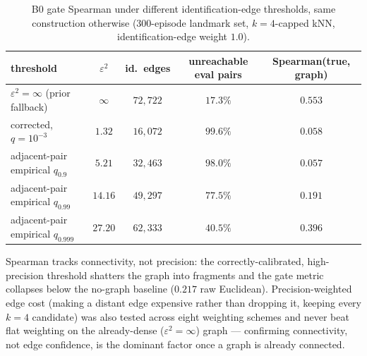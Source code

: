 \documentclass[11pt]{article}
\begin{document}
\begin{table}[h]
\centering
\small
\caption{B0 gate Spearman under different identification-edge thresholds, same construction
otherwise (300-episode landmark set, $k{=}4$-capped kNN, identification-edge weight $1.0$).}
\begin{tabular}{lcccc}
\toprule
threshold & $\varepsilon^2$ & id.\ edges & unreachable eval pairs & Spearman(true, graph) \\
\midrule
$\varepsilon^2=\infty$ (prior fallback) & $\infty$ & $72{,}722$ & $17.3\%$ & $\mathbf{0.553}$ \\
corrected, $q{=}10^{-3}$ & $1.32$ & $16{,}072$ & $99.6\%$ & $0.058$ \\
adjacent-pair empirical $q_{0.9}$ & $5.21$ & $32{,}463$ & $98.0\%$ & $0.057$ \\
adjacent-pair empirical $q_{0.99}$ & $14.16$ & $49{,}297$ & $77.5\%$ & $0.191$ \\
adjacent-pair empirical $q_{0.999}$ & $27.20$ & $62{,}333$ & $40.5\%$ & $0.396$ \\
\bottomrule
\end{tabular}
\end{table}

Spearman tracks connectivity, not precision: the correctly-calibrated, high-precision threshold
shatters the graph into fragments and the gate metric collapses below the no-graph baseline
($0.217$ raw Euclidean). Precision-weighted edge cost (making a distant edge expensive rather
than dropping it, keeping every $k{=}4$ candidate) was also tested across eight weighting
schemes and never beat flat weighting on the already-dense ($\varepsilon^2{=}\infty$) graph ---
confirming connectivity, not edge confidence, is the dominant factor once a graph is already
connected.
\end{document}
